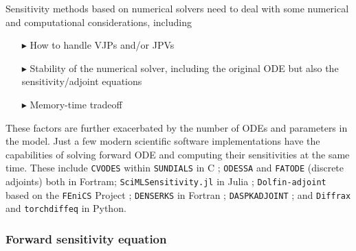 Sensitivity methods based on numerical solvers need to deal with some numerical and computational considerations, including
\begin{enumerate}
    \item[$ \blacktriangleright$] How to handle VJPs and/or JPVs 
    \item[$ \blacktriangleright$] Stability of the numerical solver, including the original ODE but also the sensitivity/adjoint equations
    \item[$ \blacktriangleright$] Memory-time tradeoff
\end{enumerate}
These factors are further exacerbated by the number of ODEs and parameters in the model. 
Just a few modern scientific software implementations have the capabilities of solving forward ODE and computing their sensitivities at the same time. 
These include 
\texttt{CVODES} within \texttt{SUNDIALS} in C \cite{serban2005cvodes, SUNDIALS-hindmarsh2005sundials}; 
\texttt{ODESSA} \cite{ODESSA} and \texttt{FATODE} (discrete adjoints) \cite{FATODE2014} both in Fortram; 
\texttt{SciMLSensitivity.jl} in Julia \cite{rackauckas2020universal}; 
\texttt{Dolfin-adjoint} based on the \texttt{FEniCS} Project \cite{dolfin2013, dolfin2018};
\texttt{DENSERKS} in Fortran \cite{alexe2007denserks}; 
\texttt{DASPKADJOINT} \cite{Cao_Li_Petzold_2002};
and \texttt{Diffrax} \cite{kidger2021on} and \texttt{torchdiffeq} \cite{torchdiffeq} in Python. 


\subsubsection{Forward sensitivity equation}
\label{section:computing-sensitivity-equations}

